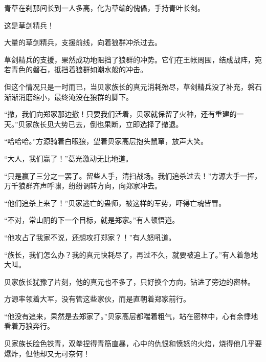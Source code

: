 \begin{this_body}
青草在刹那间长到一人多高，化为草编的傀儡，手持青叶长剑。

这是草剑精兵！

大量的草剑精兵，支援前线，向着狼群冲杀过去。

草剑精兵的支援，果然成功地阻挡了狼群的冲势。它们在王帐周围，结成战阵，宛若青色的磐石，抵挡着狼群如潮水般的冲击。

但这个情况只是一时而已，当贝家族长的真元消耗殆尽，草剑精兵没了补充，磐石渐渐消磨缩小，最终淹没在狼群的脚下。

“撤，我们向郑家那边撤！只要我们活着，贝家就保留了火种，还有重建的一天。”贝家族长见大势已去，倒也果断，立即选择了撤退。

“哈哈哈。”方源骑着白眼狼，望着贝家高层抱头鼠窜，放声大笑。

“大人，我们赢了！”葛光激动无比地道。

“只是赢了三分之一罢了。留些人手，清扫战场。我们追杀过去！”方源大手一挥，万千狼群齐声呼啸，纷纷调转方向，向郑家冲去。

“他们追杀上来了！”贝家逃亡的蛊师，被这样的军势，吓得亡魂皆冒。

“不对，常山阴的下一个目标，就是郑家。”有人顿悟道。

“他攻占了我家不说，还想攻打郑家？！”有人怒吼道。

“族长，我们怎么办？我的真元快耗尽了，再过不久，就要被追上了。”有人着急地大叫。

贝家族长犹豫了片刻，他的真元也不多了，只好换个方向，钻进了旁边的密林。

方源率领着大军，没有管这些家伙，而是直朝着郑家前行。

“他没有追来，果然是去郑家了。”贝家高层都喘着粗气，站在密林中，心有余悸地看着万狼奔行。

贝家族长脸色铁青，双拳捏得青筋直暴，心中的仇恨和愤怒的火焰，烧得他几乎要爆炸，但他却又无可奈何！

\end{this_body}

